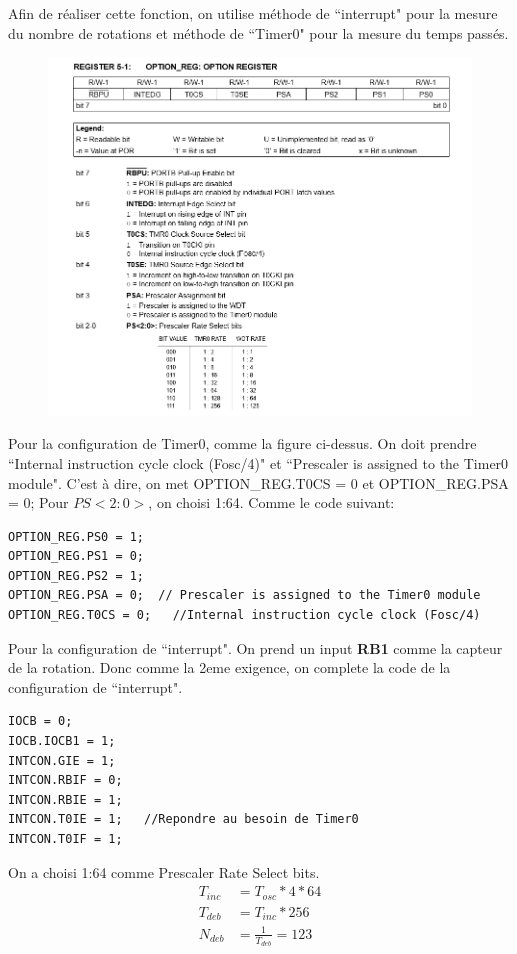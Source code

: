 \documentclass{article}
\begin{document}
Afin de réaliser cette fonction, on utilise méthode de ``interrupt" pour la mesure du nombre de rotations et méthode de ``Timer0" pour la mesure du temps passés.

\begin{figure}[H]
	\centering
	\includegraphics[width=6in]{2.PNG}
\end{figure} 
Pour la configuration de Timer0, comme la figure ci-dessus. On doit prendre ``Internal instruction cycle clock (Fosc/4)" et ``Prescaler is assigned to the Timer0 module". C'est à dire, on met OPTION\_REG.T0CS = 0 et OPTION\_REG.PSA = 0; Pour $PS<2:0>$, on choisi 1:64. Comme le code suivant:
\begin{lstlisting}[frame=shadowbox]
OPTION_REG.PS0 = 1;   
OPTION_REG.PS1 = 0;
OPTION_REG.PS2 = 1;
OPTION_REG.PSA = 0;  // Prescaler is assigned to the Timer0 module
OPTION_REG.T0CS = 0;   //Internal instruction cycle clock (Fosc/4)
\end{lstlisting}
\pagebreak
Pour la configuration de ``interrupt". On prend un input \textbf{RB1} comme la capteur de la rotation. Donc comme la 2eme exigence, on complete la code de la configuration de ``interrupt".
\begin{lstlisting}[frame=shadowbox]
IOCB = 0;          
IOCB.IOCB1 = 1;   
INTCON.GIE = 1;
INTCON.RBIF = 0;
INTCON.RBIE = 1;
INTCON.T0IE = 1;   //Repondre au besoin de Timer0
INTCON.T0IF = 1;
\end{lstlisting}
On a choisi 1:64 comme Prescaler Rate Select bits.
\begin{align*}
T_{inc} &= T_{osc}*4*64 \\
T_{deb} &= T_{inc}*256 \\
N_{deb} &= \frac{1}{T_{deb}} = 123
\end{align*}
\end{document}
